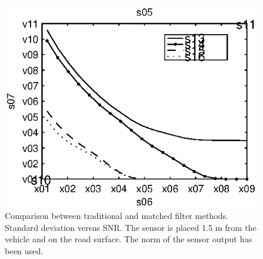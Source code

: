 \begin{subfigures}
\begin{figure}[!tbhf]
\begin{minipage}{0.45\linewidth}
   \includegraphics[width=\linewidth]{images/std_error_r}
  \caption[Time difference, method comparison. Error standard deviation. Norm.]{Comparison between traditional and matched filter methods. Standard deviation versus SNR. The sensor is placed 1.5 m from the vehicle and on the road surface. The norm of the sensor output has been used.}
  \label{fig:comp_std_r}
  \end{minipage}
 \end{figure}
\end{subfigures}

